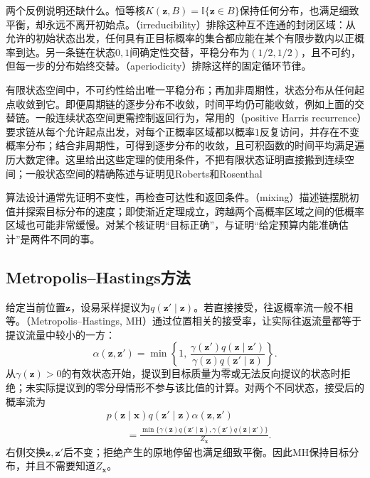 两个反例说明还缺什么。恒等核$K(\bm{z},B)=\mathbb{I}\{\bm{z}\in B\}$保持任何分布，也满足细致平衡，却永远不离开初始点。（irreducibility）排除这种互不连通的封闭区域：从允许的初始状态出发，任何具有正目标概率的集合都应能在某个有限步数内以正概率到达。另一条链在状态$0,1$间确定性交替，平稳分布为$(1/2,1/2)$，且不可约，但每一步的分布始终交替。（aperiodicity）排除这样的固定循环节律。

有限状态空间中，不可约性给出唯一平稳分布；再加非周期性，状态分布从任何起点收敛到它。即便周期链的逐步分布不收敛，时间平均仍可能收敛，例如上面的交替链。一般连续状态空间更需控制返回行为，常用的（positive Harris recurrence）要求链从每个允许起点出发，对每个正概率区域都以概率$1$反复访问，并存在不变概率分布；结合非周期性，可得到逐步分布的收敛，且可积函数的时间平均满足遍历大数定律。这里给出这些定理的使用条件，不把有限状态证明直接搬到连续空间；一般状态空间的精确陈述与证明见Roberts和Rosenthal

算法设计通常先证明不变性，再检查可达性和返回条件。（mixing）描述链摆脱初值并探索目标分布的速度；即使渐近定理成立，跨越两个高概率区域之间的低概率区域也可能非常缓慢。对某个核证明“目标正确”，与证明“给定预算内能准确估计”是两件不同的事。

\subsection{Metropolis--Hastings方法}
\label{sec:pgm-sampling-mh}

给定当前位置$\bm{z}$，设易采样提议为$q(\bm{z}'\mid\bm{z})$。若直接接受，往返概率流一般不相等。（Metropolis--Hastings, MH）通过位置相关的接受率，让实际往返流量都等于提议流量中较小的一方：
\begin{equation}
  \alpha(\bm{z},\bm{z}')
    =\min\left\{1,\,
      \frac{\gamma(\bm{z}')q(\bm{z}\mid\bm{z}')}
           {\gamma(\bm{z})q(\bm{z}'\mid\bm{z})}\right\}.
  \label{eq:pgm-sampling-mh-acceptance}
\end{equation}
从$\gamma(\bm{z})>0$的有效状态开始，提议到目标质量为零或无法反向提议的状态时拒绝；未实际提议到的零分母情形不参与该比值的计算。对两个不同状态，接受后的概率流为
\[
  \begin{aligned}
    &p(\bm{z}\mid\bm{x})q(\bm{z}'\mid\bm{z})\alpha(\bm{z},\bm{z}')\\
    &\qquad=\frac{\min\{\gamma(\bm{z})q(\bm{z}'\mid\bm{z}),
                    \gamma(\bm{z}')q(\bm{z}\mid\bm{z}')\}}
         {Z_{\bm{x}}}.
  \end{aligned}
\]
右侧交换$\bm{z},\bm{z}'$后不变；拒绝产生的原地停留也满足细致平衡。因此MH保持目标分布，并且不需要知道$Z_{\bm{x}}$。

